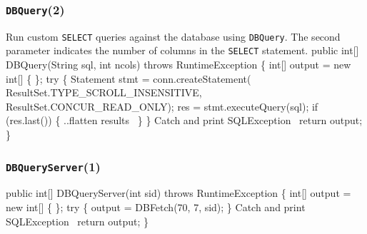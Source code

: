 \documentclass{article}
\def\nwendcode{\endtrivlist \endgroup}
\let\nwdocspar=\par
\theoremstyle{definition}
\begin{document}
\subsubsection{{\tt{}DBQuery}(2)}
Run custom {\tt{}SELECT} queries against the database using
{\tt{}DBQuery}. The second parameter indicates the number of columns in the
{\tt{}SELECT} statement.
\nwenddocs{}\endmoddef{}
public int[] DBQuery(String sql, int ncols) throws RuntimeException \{
  int[] output = new int[] \{ \};
  try \{
    Statement stmt = conn.createStatement(
      ResultSet.TYPE_SCROLL_INSENSITIVE, ResultSet.CONCUR_READ_ONLY);
    res = stmt.executeQuery(sql);
    if (res.last()) \{
      \LA{}..flatten results~{\nwtagstyle{}}\RA{}
    \}
  \}
  \LA{}Catch and print \code{}SQLException\edoc{}~{\nwtagstyle{}}\RA{}
  return output;
\}
\nwendcode{}%

\subsubsection{{\tt{}\protect{}\protect{}DBQueryServer}(1)}
\nwenddocs{}\endmoddef{}
public int[] DBQueryServer(int sid) throws RuntimeException \{
  int[] output = new int[] \{ \};
  try \{
    output = DBFetch(70, 7, sid);
  \}
  \LA{}Catch and print \code{}SQLException\edoc{}~{\nwtagstyle{}}\RA{}
  return output;
\}
\eatline
{}\nwendcode{}\nwdocspar
\end{document}
